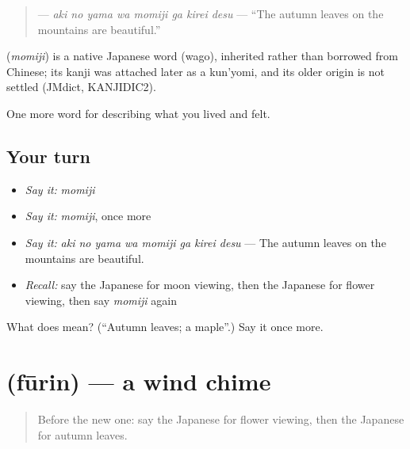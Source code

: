 \begin{quote}
\textbf{   } — \emph{aki no yama wa momiji ga kirei desu} — \textquotedblleft{}The autumn leaves on the mountains are beautiful.\textquotedblright{}
\end{quote}

\begin{cousinweb}
\textbf{} (\emph{momiji}) is a native Japanese word (wago), inherited rather than borrowed from Chinese; its kanji was attached later as a kun'yomi, and its older origin is not settled (JMdict, KANJIDIC2).
\end{cousinweb}

\begin{grammarlens}[title={What you've built}]
One more word for describing what you lived and felt.
\end{grammarlens}

\subsection*{Your turn}
\begin{itemize}
\raggedright
  \item \emph{Say it:} \emph{momiji}
  \item \emph{Say it:} \emph{momiji}, once more
  \item \emph{Say it:} \emph{aki no yama wa momiji ga kirei desu} — The autumn leaves on the mountains are beautiful.
  \item \emph{Recall:} say the Japanese for moon viewing, then the Japanese for flower viewing, then say \emph{momiji} again
\end{itemize}

\begin{tcolorbox}[breakable,colback=teal!4,colframe=teal!35!black,title={Before you move on}]
What does  mean? (\textquotedblleft{}Autumn leaves; a maple\textquotedblright{}.) Say it once more.
\end{tcolorbox}
\section[\texorpdfstring{\ja{ふうりん} (fūrin)}{ふうりん (fūrin)}]{ (fūrin) — a wind chime}

\label{lesson:JA-C501-fuurin}



\begin{quote}
Before the new one: say the Japanese for flower viewing, then the Japanese for autumn leaves.
\end{quote}

